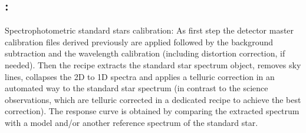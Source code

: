 \subsection{:}
Spectrophotometric standard stars calibration: As first step the detector master calibration files derived previously are applied followed by the background subtraction and 
the wavelength calibration (including distortion correction, if needed). Then the recipe extracts the standard star spectrum object, removes sky lines, collapses the 2D to 1D spectra and applies a telluric correction in an automated way to the standard star spectrum (in contrast to the science observations, which are telluric corrected in a dedicated recipe to achieve the best correction). The response curve is obtained by comparing the extracted spectrum with a model and/or another reference spectrum of the
standard star.
